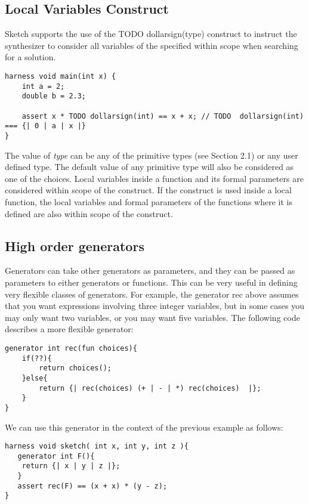 \subsection{Local Variables Construct}

Sketch supports the use of the TODO dollarsign(type) construct to instruct the synthesizer to consider all variables of the specified  within scope when searching for a solution. 

\begin{lstlisting}
harness void main(int x) {
    int a = 2;
    double b = 2.3;
        
    assert x * TODO dollarsign(int) == x + x; // TODO  dollarsign(int) === {| 0 | a | x |}
}
\end{lstlisting}

The value of \textit{type} can be any of the primitive types (see Section 2.1) or any user defined type. The default value of any primitive type will also be considered as one of the choices. Local variables inside a function and its formal parameters are considered within scope of the construct. If the construct is used inside a local function, the local variables and formal parameters of the functions where it is defined are also within scope of the construct.


\subsection{High order generators}

Generators can take other generators as parameters, and they can be passed as parameters to either generators or functions. This can be very useful in defining very flexible classes of generators. For example, the generator rec above assumes that you want expressions involving three integer variables, but in some cases you may only want two variables, or you may want five variables. The following code describes a more flexible generator: 

\begin{lstlisting}
generator int rec(fun choices){ 
    if(??){ 
        return choices();
    }else{
        return {| rec(choices) (+ | - | *) rec(choices)  |};
    }
}
\end{lstlisting}

We can use this generator in the context of the previous example as follows:
\begin{lstlisting}
harness void sketch( int x, int y, int z ){
   generator int F(){
	return {| x | y | z |};
   }
   assert rec(F) == (x + x) * (y - z);
}
\end{lstlisting}

